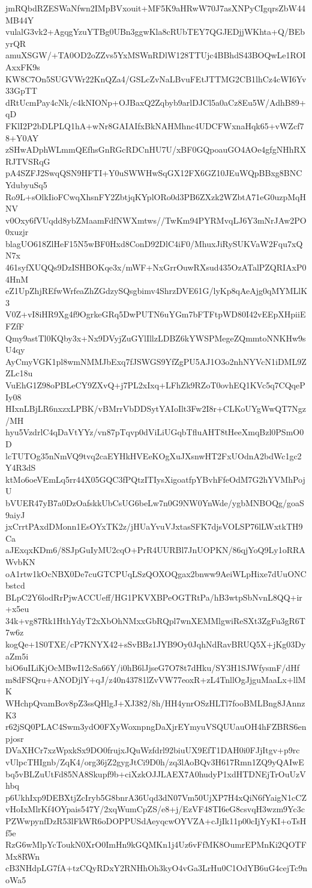jmRQbdRZESWaNfwn2IMpBVxouit+MF5K9aHRwW70J7asXNPyCIgqrsZbW44MB44Y
vulalG3vk2+AgqgYzuYTBg0UBn3ggwKla8cRUbTEY7QGJEDjjWKhta+Q/BEbyrQR
amuXSGW/+TA0OD2oZZvs5YxMSWnRDlW128TTUjc4BBhdS43BOQwLe1ROIAxxFK9s
KW8C7On5SUGVWr22KnQZa4/GSLcZvNaLBvuFEtJTTMG2CB1lhCz4cWI6Yv33GpTT
dRtUcmPay4cNk/c4kNIONp+OJBaxQ2Zqbyb9arlDJCl5a0aCz8Eu5W/AdhB89+qD
FKlI2P2bDLPLQ1hA+wNr8GAIAIfxBkNAHMhnc4UDCFWxnaHqk65+vWZcf78+Y0AY
zSHwADphWLmmQEfhsGnRGcRDCnHU7U/xBF0GQpoauGO4AOe4gfgNHhRXRJTVSRqG
pA4SZFJ2SwqQSN9HFTI+Y0uSWWHwSqGX12FX6GZ10JEuWQpBBxg8BNCYdubyuSq5
Ro9L+sOlkIioFCwqXhsnFY2ZbtjqKYplORo0d3PB6ZXzk2WZbtA71eG0uzpMqHNV
v0Oxy6fVUqdd8ybZMaamFdfNWXmtws//TwKm94PYRMvqLJ6Y3mNrJAw2PO0xuzjr
blagUO618ZlHeF15N5wBF0Hxd8ConD92DlC4iF0/MhuxJiRySUKVaW2Fqu7xQN7x
461syfXUQQs9DzISHBOKqe3x/mWF+NxGrrOuwRXsud435OzATalPZQRIAxP04HnM
eZ1UpZhjREfwWrfeaZhZGdzySQsgbimv4ShrzDVE61G/lyKp8qAeAjg0qMYMLlK3
V0Z+vI8iHR9Xg4f9OgrkeGRq5DwPUTN6uYGm7bFTFtpWD80I42vEEpXHpiiEFZfF
Qmy9astTl0KQby3x+Nx9DVyjZuGYlIllzLDBZ6kYWSPMegeZQmmtoNNKHw9sU4qy
AyCmyVGK1pl8wmNMMJbExq7fJSWGS9YfZgPU5AJ1O3o2nhNYVcN1iDML9ZZLc18u
VuEhG1Z98oPBLeCY9ZXvQ+j7PL2xIxq+LFhZk9RZoT0ovhEQ1KVc5q7CQqePIy08
HIxnLBjLR6nxzxLPBK/vBMrrVbDDSytYAIoIlt3Fw2I8r+CLKoUYgWwQT7Ngz/MH
hyu5VzdrlC4qDaVtYYz/vn87pTqvp0dViLiUGqbTfluAHT8tHeeXmqBzl0PSmO0D
lcTUTOg35nNmVQ9tvq2caEYHkHVEeKOgXuJXsnwHT2FxUOdnA2bdWc1gc2Y4R3dS
ktMo6oeVEmLq5rr44X05GQC3fPQtzITIysXigoatfpYBvhFfeOdM7G2hYVMhPojU
bVUER47yB7a0DzOafskkUbCsUG6beLw7n0G9NW0YnWde/ygbMNBOQg/goaS9aiyJ
jxCrrtPAxdDMonn1EsOYxTK2z/jHUaYvuVJxtasSFK7djsVOLSP76lLWxtkTH9Ca
aJExqxKDm6/8SJpGuIyMU2cqO+PrR4UURBl7JnUOPKN/86qjYoQ9Ly1oRRAWvbKN
oA1rtw1kOcNBX0De7cuGTCPUqLSzQOXOQgax2bnww9AeiWLpHixe7dUuONCbstcd
BLpC2Y6lodRrPjwACCUeff/HG1PKVXBPeOGTRtPa/hB3wtpSbNvnL8QQ+ir+x5eu
34k+vg87Rk1HthYdyT2xXbOhNMxxGbRQpl7wnXEMMlgwiReSXt3ZgFu3gR6T7w6z
kogQe+1S0TXE/cP7KNYX42+sSvBBz1JYB9Oy0JqhNdRavBRUQ5X+jKg03DyaZm5i
biO6uILiKjOcMBwI12cSa66Y/i0hB6lJjseG7O78t7dHku/SY3H1SJWfysmF/dHf
m8dFSQru+ANODjlY+qJ/z40n43781lZvVW77eoxR+zL4TnllOgJjguMaaLx+llMK
WHchpQvamBov8pZ3ssQHlgJ+XJ382/8h/HH4ynrOSzHLTl7fooBMLBng8JAnnzK3
r62jSQ0PLAC4Swm3ydO0FXyWoxnpngDaXjrEYmyuVSQUUauOH4hFZBRS6enpjosr
DVaXHCr7xzWpxkSx9DO0frujxJQuWzfdrl92biuUX9EfT1DAH0i0FJjItgv+p9rc
vUlpcTHIgnb/ZqK4/org36jZ2gygJtCi9D0h/zq3lAoBQv3H617Rmn1ZQ9yQAIwE
bq5vBLZuUtFd85NA8Skupf9b+ciXzkOJJLAEX7A0hudyP1xdHTDNEjTrOuUzVhbq
p6UkhIxp9DEBXtjZcIryb5G8bnrA36Uqd3dN07Vm50UjXP7H4xQiN6fYaigN1cCZ
vHoIxMlrKf4OYpais547Y/2xqWumCpZS/e8+j/EzVF48TI6eG8csvqH3wzm9Yc3c
PZWwpynfDzR53lFkWR6oDOPPUSdAeyqcwOYVZA+cJjIk11p00cIjYyKI+oTsHf5e
RzG6wMlpYcToukN0XrO0ImHn9kGQMKn1j4Uz6vFfMK8OumrEPMnKi2QOTFMx8RWn
cB3NHdpLG7fA+tzCQyRDxY2RNHhOh3kyO4vGa3LrHu0C1OdYB6uG4cejTc9noWa5
